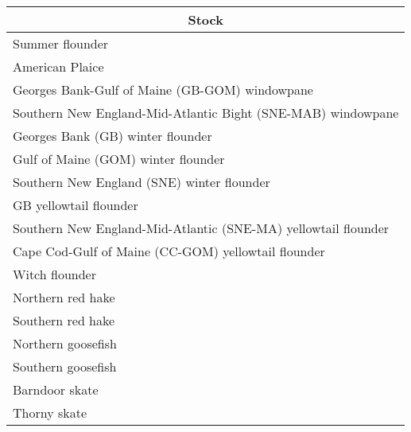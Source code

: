 \begin{center}
\begin{tabular}{l}
\hline
\multicolumn{1}{c}{Stock}\tabularnewline
\hline
Summer flounder\tabularnewline
American Plaice\tabularnewline
Georges Bank-Gulf of Maine (GB-GOM) windowpane\tabularnewline
Southern New England-Mid-Atlantic Bight (SNE-MAB) windowpane\tabularnewline
Georges Bank (GB) winter flounder\tabularnewline
Gulf of Maine (GOM) winter flounder\tabularnewline
Southern New England (SNE) winter flounder\tabularnewline
GB yellowtail flounder\tabularnewline
Southern New England-Mid-Atlantic (SNE-MA) yellowtail flounder\tabularnewline
Cape Cod-Gulf of Maine (CC-GOM) yellowtail flounder\tabularnewline
Witch flounder\tabularnewline
Northern red hake\tabularnewline
Southern red hake\tabularnewline
Northern goosefish\tabularnewline
Southern goosefish\tabularnewline
Barndoor skate\tabularnewline
Thorny skate\tabularnewline
\hline
\end{tabular}\end{center}
